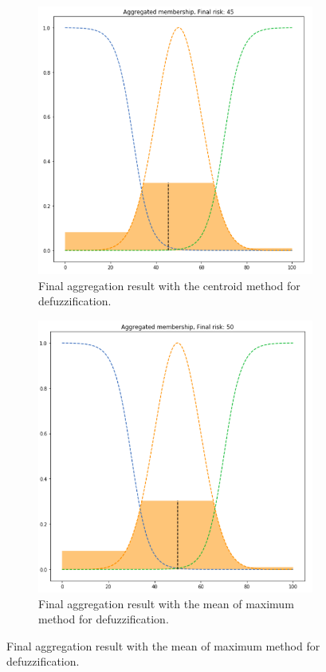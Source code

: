 \begin{figure}[ht]
\begin{subfigure}{.5\textwidth}
  \centering
  \includegraphics[width=.8\linewidth]{figures/second/prod-centroid.png}  
  \caption{Final aggregation result with the centroid method for defuzzification.}
  \label{fig:2prod-centroid}
\end{subfigure}
\begin{subfigure}{.5\textwidth}
  \centering
  \includegraphics[width=.8\linewidth]{figures/second/prod-mom.png}  
  \caption{Final aggregation result with the mean of maximum method for defuzzification.}
  \label{fig:2prod-mom}
\end{subfigure}

\end{figure}
